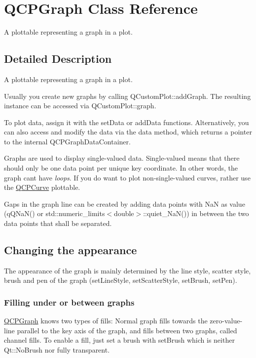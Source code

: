 \hypertarget{class_q_c_p_graph}{}\section{Q\+C\+P\+Graph Class Reference}
\label{class_q_c_p_graph}


A plottable representing a graph in a plot.  




\subsection{Detailed Description}
A plottable representing a graph in a plot. 



Usually you create new graphs by calling Q\+Custom\+Plot\+::add\+Graph. The resulting instance can be accessed via Q\+Custom\+Plot\+::graph.

To plot data, assign it with the set\+Data or add\+Data functions. Alternatively, you can also access and modify the data via the data method, which returns a pointer to the internal Q\+C\+P\+Graph\+Data\+Container.

Graphs are used to display single-\/valued data. Single-\/valued means that there should only be one data point per unique key coordinate. In other words, the graph can\textquotesingle{}t have {\itshape loops}. If you do want to plot non-\/single-\/valued curves, rather use the \mbox{\hyperlink{class_q_c_p_curve}{Q\+C\+P\+Curve}} plottable.

Gaps in the graph line can be created by adding data points with NaN as value ({\ttfamily q\+Q\+Na\+N()} or {\ttfamily std\+::numeric\+\_\+limits$<$double$>$\+::quiet\+\_\+\+Na\+N()}) in between the two data points that shall be separated.\hypertarget{class_q_c_p_graph_qcpgraph-appearance}{}\subsection{Changing the appearance}\label{class_q_c_p_graph_qcpgraph-appearance}
The appearance of the graph is mainly determined by the line style, scatter style, brush and pen of the graph (set\+Line\+Style, set\+Scatter\+Style, set\+Brush, set\+Pen).\hypertarget{class_q_c_p_graph_filling}{}\subsubsection{Filling under or between graphs}\label{class_q_c_p_graph_filling}
\mbox{\hyperlink{class_q_c_p_graph}{Q\+C\+P\+Graph}} knows two types of fills\+: Normal graph fills towards the zero-\/value-\/line parallel to the key axis of the graph, and fills between two graphs, called channel fills. To enable a fill, just set a brush with set\+Brush which is neither Qt\+::\+No\+Brush nor fully transparent.

